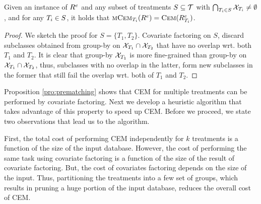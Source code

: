 \vspace{-0.2cm}
\begin{proposition} \label{pro:prematching}
Given an  instance of ${{R}^e}$ and any subset of treatments $S\subseteq {{\mathcal{T}}}$ with
$\bigcap_{T_i \in S} {{\mathcal{X}}}_{T_i} \not = \emptyset$, and for any $T_i \in S$, it holds that ${\textsc{mCem}_{T_i}}({{R}^e})={\textsc{Cem}}({{R}^e_{T_i}})$.
\end{proposition}
\vspace{-0.1cm}

\begin{proof}
  We sketch the proof for $S=\{T_1, T_2\}$. Covariate factoring on $S$, discard subclasses obtained from group-by
  on ${{\mathcal{X}}}_{T_1} \cap {{\mathcal{X}}}_{T_2}$ that have no overlap wrt. both $T_1$ and $T_2$. It is clear that group-by ${{\mathcal{X}}}_{T_1}$ is more fine-grained  than group-by on ${{\mathcal{X}}}_{T_1} \cap {{\mathcal{X}}}_{T_2}$, thus, subclasses with no overlap in the latter, form new subclasses in the former that still fail the overlap wrt. both of $T_1$ and $T_2$.
\end{proof}
Proposition \ref{pro:prematching} shows that CEM for multiple treatments can be performed by covariate factoring.
Next we develop a heuristic algorithm that takes advantage of this property to speed up CEM.
Before we proceed, we  state two observations that lead us to the algorithm.

First,  the total cost of performing  CEM independently for $k$ treatments
is a function of the size of the input database. However, the cost of performing the same task using covariate factoring
is a function of the size of the result of covariate factoring. But, the cost of covariates factoring
depends on the size of the input. Thus,  partitioning the treatments into a few set of groups, which results in pruning a huge
portion of the input database, reduces the overall cost of CEM.





